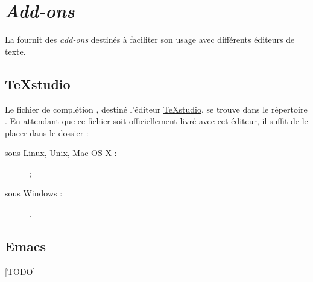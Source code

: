 \chapter{\emph{Add-ons}}\label{cha:add-ons}

La \yatcl{} fournit des \emph{add-ons} destinés à faciliter son usage avec
différents éditeurs de texte.

\section{TeXstudio}
\label{sec:texstudio}

Le fichier de complétion , destiné l'éditeur
\href{http://texstudio.sourceforge.net/}{TeXstudio}, se trouve dans le
répertoire . En attendant
que ce fichier soit officiellement livré avec cet éditeur, il suffit de le
placer dans le dossier :
\begin{description}
\item[sous Linux, Unix, Mac OS X :]  ;
\item[sous Windows :] .
\end{description}

\section{Emacs}
\label{sec:emacs}

[TODO]
%
\iffalse
\fi

